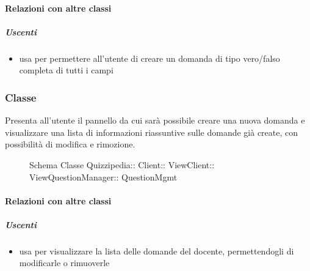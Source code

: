 \paragraph{Relazioni con altre classi}
\subparagraph{Uscenti}
\begin{itemize}
\item usa  per permettere all'utente di creare un domanda di tipo vero/falso completa di tutti i campi
\end{itemize}
\subsubsection{Classe }
Presenta all'utente il pannello da cui sarà possibile creare una nuova domanda e visualizzare una lista di informazioni riassuntive sulle domande già create, con possibilità di modifica e rimozione.
\begin{figure}[H]
\centering
\noindent{}
\caption[Schema Classe QuestionMgmt]{Schema Classe Quizzipedia:: Client:: ViewClient:: ViewQuestionManager:: QuestionMgmt}
\end{figure}
\paragraph{Relazioni con altre classi}
\subparagraph{Uscenti}
\begin{itemize}
\item usa  per visualizzare la lista delle domande del docente, permettendogli di modificarle o rimuoverle
\end{itemize}
